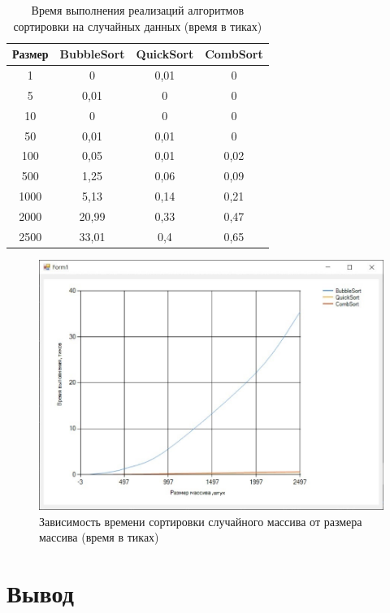 \captionsetup{justification=raggedright, singlelinecheck=false}

\begin{table}[h]
	\begin{center}
		\caption{Время выполнения реализаций алгоритмов сортировки на случайных данных (время в тиках)}
		\label{tbl:random}
		\begin{tabular}{|c|c|c|c|}
			\hline
			Размер & BubbleSort &  QuickSort &  CombSort \\
			\hline
			1&	0&	0,01&	0\\
			\hline
			5&	0,01&	0&	0\\
			\hline
			10&	0&	0&	0\\
			\hline
			50&	0,01&	0,01&	0\\
			\hline
			100&	0,05&	0,01&	0,02\\
			\hline
			500&	1,25&	0,06&	0,09\\
			\hline
			1000&	5,13&	0,14&	0,21\\
			\hline
			2000&	20,99&	0,33&	0,47\\
			\hline
			2500&	33,01&	0,4&	0,65\\
			\hline
		\end{tabular}
	\end{center}
	
\end{table}

\captionsetup{justification=centering, singlelinecheck=false}

\begin{figure}[H]
	\centering
	\includegraphics[width=0.7\linewidth]{inc/img/rand}
	\caption{Зависимость времени сортировки случайного массива от размера массива (время в тиках)}
	\label{fig:rand}
\end{figure}

\clearpage

\section*{Вывод}

